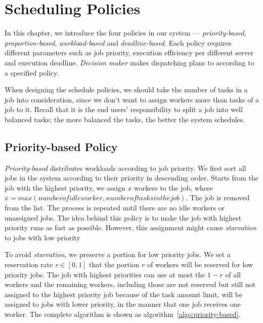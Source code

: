 \chapter{Scheduling Policies}\label{sec:policy}

In this chapter, we introduce the four policies in our system ---
\emph{priority-based}, \emph{proportion-based}, \emph{workload-based}
and \emph{deadline-based}.
Each policy requires different parameters such as job priority,
execution efficiency per different server and execution deadline.
\emph{Decision maker} makes dispatching plans to according to a
specified policy.

When designing the schedule policies, we should take the number of tasks
in a job into consideration, since we don't want to assign workers more
than tasks of a job to it.
Recall that it is the end users' responsibility to split a job into well
balanced tasks; the more balanced the tasks, the better the system
schedules.


\section{Priority-based Policy}	%

\emph{Priority-based} distributes workloads according to job priority. 
We first sort all jobs in the system according to their priority in 
descending order.
Starts from the job with the highest priority, we assign $x$ workers to
the job, where $x = max(number of idle worker, number of tasks in the 
job)$.
The job is removed from the list.
The process is repeated until there are no idle workers or unassigned 
jobs.
The idea behind this policy is to make the job with highest priority 
runs as fast as possible.
However, this assignment might cause \emph{starvation} to jobs with 
low priority

To avoid \emph{starvation}, we preserve a portion for low priority jobs.
We set a reservation rate $r \in [0,1]$ that the portion $r$ of workers
will be reserved for low priority jobs.
The job with highest priorities can use at most the $1-r$ of all workers
and the remaining workers, including those are not reserved but still not
assigned to the highest priority job because of the task amount limit,
will be assigned to jobs with lower priority, in the manner that one job
receives one worker.
The complete algorithm is shown as algorithm~\ref{algo:priority-based}.

